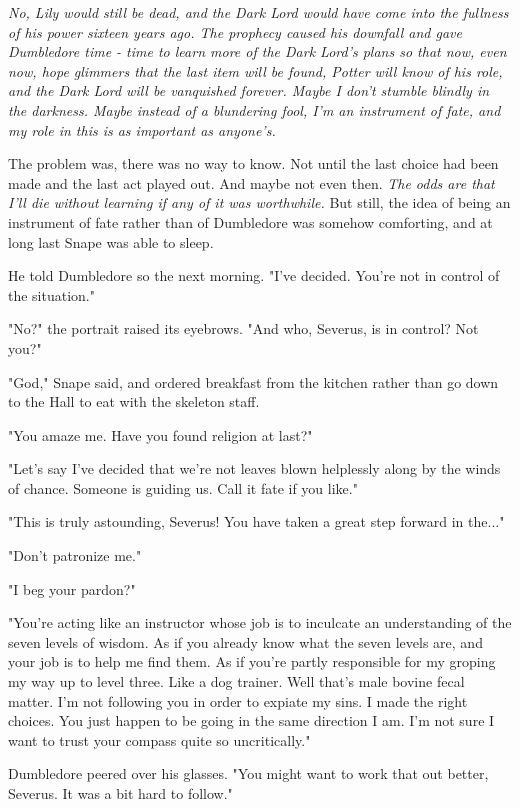\emph{No, Lily would still be dead, and the Dark Lord would have come into the fullness of his power sixteen years ago. The prophecy caused his downfall and gave Dumbledore time - time to learn more of the Dark Lord's plans so that now, even now, hope glimmers that the last item will be found, Potter will know of his role, and the Dark Lord will be vanquished forever. Maybe I don't stumble blindly in the darkness. Maybe instead of a blundering fool, I'm an instrument of fate, and my role in this is as important as anyone's.}

The problem was, there was no way to know. Not until the last choice had been made and the last act played out. And maybe not even then. \emph{The odds are that I'll die without learning if any of it was worthwhile.} But still, the idea of being an instrument of fate rather than of Dumbledore was somehow comforting, and at long last Snape was able to sleep.

He told Dumbledore so the next morning. "I've decided. You're not in control of the situation."

"No?" the portrait raised its eyebrows. "And who, Severus, is in control? Not you?"

"God," Snape said, and ordered breakfast from the kitchen rather than go down to the Hall to eat with the skeleton staff.

"You amaze me. Have you found religion at last?"

"Let's say I've decided that we're not leaves blown helplessly along by the winds of chance. Someone is guiding us. Call it fate if you like."

"This is truly astounding, Severus! You have taken a great step forward in the..."

"Don't patronize me."

"I beg your pardon?"

"You're acting like an instructor whose job is to inculcate an understanding of the seven levels of wisdom. As if you already know what the seven levels are, and your job is to help me find them. As if you're partly responsible for my groping my way up to level three. Like a dog trainer. Well that's male bovine fecal matter. I'm not following you in order to expiate my sins. I made the right choices. You just happen to be going in the same direction I am. I'm not sure I want to trust your compass quite so uncritically."

Dumbledore peered over his glasses. "You might want to work that out better, Severus. It was a bit hard to follow."

